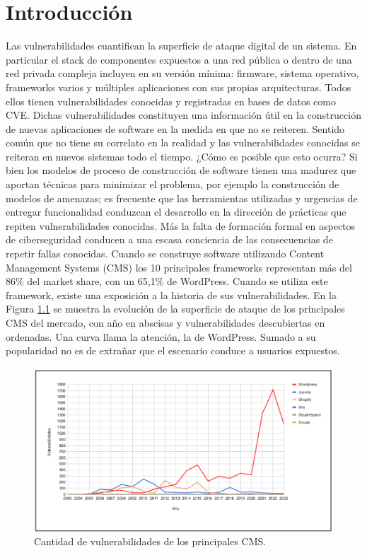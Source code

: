 \chapter{Introducción}

Las vulnerabilidades cuantifican la superficie de ataque digital de un sistema. En particular el stack de componentes expuestos a una red pública o dentro de una red privada compleja incluyen en su versión mínima: firmware, sistema operativo, frameworks varios y múltiples aplicaciones con sus propias arquitecturas. Todos ellos tienen vulnerabilidades conocidas y registradas en bases de datos como CVE\cite{CVE}. Dichas vulnerabilidades constituyen una información útil en la construcción de nuevas aplicaciones de software en la medida en que no se reiteren. Sentido común que no tiene su correlato en la realidad y las vulnerabilidades conocidas se reiteran en nuevos sistemas todo el tiempo.
¿Cómo es posible que esto ocurra? Si bien los modelos de proceso de construcción de software tienen una madurez que aportan técnicas para minimizar el problema, por ejemplo la construcción de modelos de amenazas\cite{Microsoft_Threat_Modeling_Tool}; es frecuente que las herramientas utilizadas y urgencias de entregar funcionalidad conduzcan el desarrollo en la dirección de prácticas que repiten vulnerabilidades conocidas. Más la falta de formación formal en aspectos de ciberseguridad conducen a una escasa conciencia de las consecuencias de repetir fallas conocidas. Cuando se construye software utilizando Content Management Systems (CMS) los 10 principales frameworks representan más del 86\% del market share, con un 65,1\% de WordPress\cite{IONOS_CMS}. Cuando se utiliza este framework, existe una exposición a la historia de sus vulnerabilidades. En la Figura \ref{fig:mi_imagen} se muestra la evolución de la superficie de ataque de los principales CMS del mercado, con año en abscisas y vulnerabilidades descubiertas en ordenadas. Una curva llama la atención, la de WordPress. Sumado a su popularidad no es de extrañar que el escenario conduce a usuarios expuestos.

\begin{figure}[H]
    \centering
    \includegraphics[width=1\textwidth]{Imagenes/wpcms.png}
    \caption{Cantidad de vulnerabilidades de los principales CMS.}
    \label{fig:mi_imagen}
\end{figure}